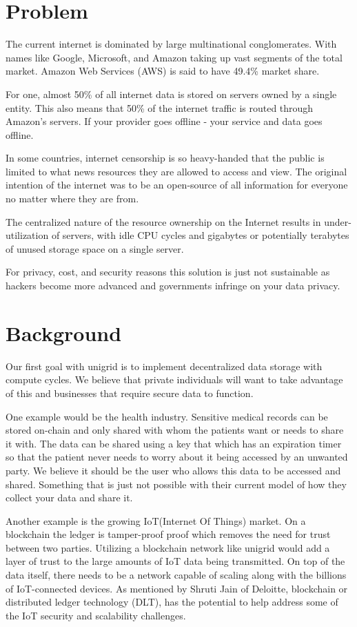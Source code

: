 \documentclass[12pt]{article}
\begin{document}
\newpage
\section*{Problem}

The current internet is dominated by large multinational conglomerates. With names like Google, Microsoft, and Amazon taking up vast segments of the total market. Amazon Web Services (AWS) is said to have 49.4\% market share\cite{jeb2019}.

For one, almost 50\% of all internet data is stored on servers owned by a single entity\cite{jeb2019}. This also means that 50\% of the internet traffic is routed through Amazon’s servers\cite{jeb2019}. If your provider goes offline - your service and data goes offline.

In some countries, internet censorship is so heavy-handed that the public is limited to what news resources they are allowed to access and view\cite{wiki2021}. The original intention of the internet was to be an open-source of all information for everyone no matter where they are from.

The centralized nature of the resource ownership on the Internet results in under-utilization of servers, with idle CPU cycles and gigabytes or potentially terabytes of unused storage space on a single server.

For privacy, cost, and security reasons this solution is just not sustainable as hackers become more advanced and governments infringe on your data privacy.


\section*{Background}
Our first goal with unigrid is to implement decentralized data storage with compute cycles. We believe that private individuals will want to take advantage of this and businesses that require secure data to function.

One example would be the health industry. Sensitive medical records can be stored on-chain and only shared with whom the patients want or needs to share it with. The data can be shared using a key that which has an expiration timer so that the patient never needs to worry about it being accessed by an unwanted party. We believe it should be the user who allows this data to be accessed and shared. Something that is just not possible with their current model of how they collect your data and share it.

Another example is the growing IoT(Internet Of Things) market. On a blockchain the ledger is tamper-proof proof which removes the need for trust between two parties. Utilizing a blockchain network like unigrid would add a layer of trust to the large amounts of IoT data being transmitted. On top of the data itself, there needs to be a network capable of scaling along with the billions of IoT-connected devices. As mentioned by Shruti Jain of Deloitte\cite{jain2021}, blockchain or distributed ledger technology (DLT), has the potential to help address some of the IoT security and scalability challenges.
\end{document}
